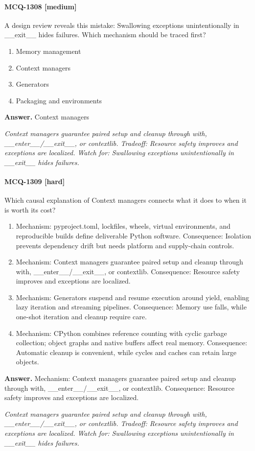 \paragraph{MCQ-1308 [medium]} A design review reveals this mistake: Swallowing exceptions unintentionally in \_\_exit\_\_ hides failures. Which mechanism should be traced first?
\begin{enumerate}[label=\Alph*.]
\item Memory management
\item Context managers
\item Generators
\item Packaging and environments
\end{enumerate}
\noindent\textbf{Answer.} Context managers
\par\textit{Context managers guarantee paired setup and cleanup through with, \_\_enter\_\_/\_\_exit\_\_, or contextlib. Tradeoff: Resource safety improves and exceptions are localized. Watch for: Swallowing exceptions unintentionally in \_\_exit\_\_ hides failures.}
\paragraph{MCQ-1309 [hard]} Which causal explanation of Context managers connects what it does to when it is worth its cost?
\begin{enumerate}[label=\Alph*.]
\item Mechanism: pyproject.toml, lockfiles, wheels, virtual environments, and reproducible builds define deliverable Python software. Consequence: Isolation prevents dependency drift but needs platform and supply-chain controls.
\item Mechanism: Context managers guarantee paired setup and cleanup through with, \_\_enter\_\_/\_\_exit\_\_, or contextlib. Consequence: Resource safety improves and exceptions are localized.
\item Mechanism: Generators suspend and resume execution around yield, enabling lazy iteration and streaming pipelines. Consequence: Memory use falls, while one-shot iteration and cleanup require care.
\item Mechanism: CPython combines reference counting with cyclic garbage collection; object graphs and native buffers affect real memory. Consequence: Automatic cleanup is convenient, while cycles and caches can retain large objects.
\end{enumerate}
\noindent\textbf{Answer.} Mechanism: Context managers guarantee paired setup and cleanup through with, \_\_enter\_\_/\_\_exit\_\_, or contextlib. Consequence: Resource safety improves and exceptions are localized.
\par\textit{Context managers guarantee paired setup and cleanup through with, \_\_enter\_\_/\_\_exit\_\_, or contextlib. Tradeoff: Resource safety improves and exceptions are localized. Watch for: Swallowing exceptions unintentionally in \_\_exit\_\_ hides failures.}

